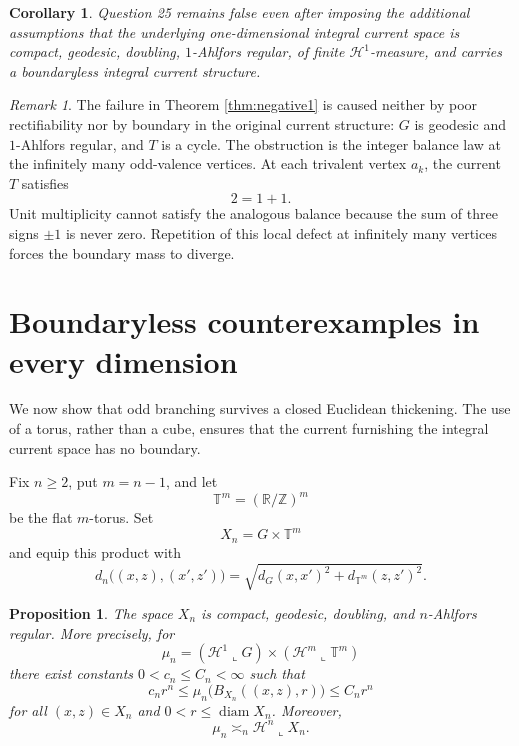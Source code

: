 \documentclass[11pt]{article}
\newtheorem{corollary}[theorem]{Corollary}
\newtheorem{proposition}[theorem]{Proposition}
\theoremstyle{remark}
\newtheorem{remark}[theorem]{Remark}
\newcommand{\Hh}{\mathcal H}
\newcommand{\diam}{\operatorname{diam}}
\begin{document}
\begin{corollary}\label{cor:strong}
Question 25 remains false even after imposing the additional assumptions that the underlying one-dimensional integral current space is compact, geodesic, doubling, $1$-Ahlfors regular, of finite $\Hh^1$-measure, and carries a boundaryless integral current structure.
\end{corollary}

\begin{remark}\label{rem:kirchhoff}
The failure in Theorem \ref{thm:negative1} is caused neither by poor rectifiability nor by boundary in the original current structure: $G$ is geodesic and $1$-Ahlfors regular, and $T$ is a cycle. The obstruction is the integer balance law at the infinitely many odd-valence vertices. At each trivalent vertex $a_k$, the current $T$ satisfies
\[
      2=1+1.
\]
Unit multiplicity cannot satisfy the analogous balance because the sum of three signs $\pm1$ is never zero. Repetition of this local defect at infinitely many vertices forces the boundary mass to diverge.
\end{remark}

\section{Boundaryless counterexamples in every dimension}\label{sec:highdim}

We now show that odd branching survives a closed Euclidean thickening. The use of a torus, rather than a cube, ensures that the current furnishing the integral current space has no boundary.

Fix $n\ge2$, put $m=n-1$, and let
\[
       \mathbb T^m=(\mathbb R/\mathbb Z)^m
\]
be the flat $m$-torus. Set
\[
       X_n=G\times\mathbb T^m
\]
and equip this product with
\[
 d_n\bigl((x,z),(x',z')\bigr)
 =\sqrt{d_G(x,x')^2+d_{\mathbb T^m}(z,z')^2}.
\]

\begin{proposition}\label{prop:product-geometry}
The space $X_n$ is compact, geodesic, doubling, and $n$-Ahlfors regular. More precisely, for
\[
 \mu_n=(\Hh^1\llcorner G)
       \times(\Hh^m\llcorner\mathbb T^m)
\]
there exist constants $0<c_n\le C_n<\infty$ such that
\[
 c_n r^n\le
 \mu_n\bigl(B_{X_n}((x,z),r)\bigr)
 \le C_n r^n
\]
for all $(x,z)\in X_n$ and $0<r\le\diam X_n$. Moreover,
\[
       \mu_n\asymp_n\Hh^n\llcorner X_n.
\]
\end{proposition}
\end{document}
